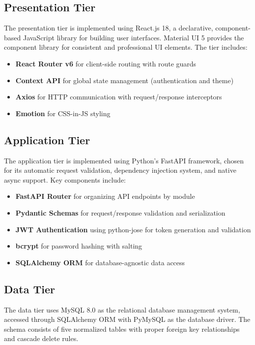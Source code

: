 \subsection{Presentation Tier}

The presentation tier is implemented using React.js 18, a declarative, component-based JavaScript library for building user interfaces. Material UI 5 provides the component library for consistent and professional UI elements. The tier includes:

\begin{itemize}
  \item \textbf{React Router v6} for client-side routing with route guards
  \item \textbf{Context API} for global state management (authentication and theme)
  \item \textbf{Axios} for HTTP communication with request/response interceptors
  \item \textbf{Emotion} for CSS-in-JS styling
\end{itemize}

\subsection{Application Tier}

The application tier is implemented using Python's FastAPI framework, chosen for its automatic request validation, dependency injection system, and native async support. Key components include:

\begin{itemize}
  \item \textbf{FastAPI Router} for organizing API endpoints by module
  \item \textbf{Pydantic Schemas} for request/response validation and serialization
  \item \textbf{JWT Authentication} using python-jose for token generation and validation
  \item \textbf{bcrypt} for password hashing with salting
  \item \textbf{SQLAlchemy ORM} for database-agnostic data access
\end{itemize}

\subsection{Data Tier}

The data tier uses MySQL 8.0 as the relational database management system, accessed through SQLAlchemy ORM with PyMySQL as the database driver. The schema consists of five normalized tables with proper foreign key relationships and cascade delete rules.

